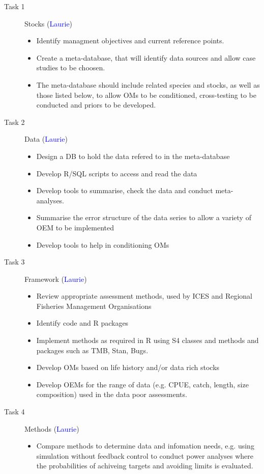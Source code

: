 \documentclass[a4paper, 10pt]{article}
\newcommand{\laurie}{\textcolor{blue}}
\begin{document}
\begin{description}
 \item[Task 1] Stocks (\laurie{Laurie})
 \begin{itemize}
  \item Identify managment objectives and current reference points.
  \item Create a meta-database, that will identify data sources and allow case studies to be choosen.
  \item The meta-database should include related species and stocks, as well as those listed below, to allow OMs to be conditioned, cross-testing to be conducted and priors to be developed.
 \end{itemize}
 \item[Task 2] Data (\laurie{Laurie})
  \begin{itemize}
  \item Design a DB to hold the data refered to in the meta-database
  \item Develop R/SQL scripts to access and read the data
  \item Develop tools to summarise, check the data and conduct meta-analyses. 
  \item Summarise the error structure of the data series to allow a variety of OEM to be implemented
  \item Develop tools to help in conditioning OMs
 \end{itemize}
 \item[Task 3] Framework (\laurie{Laurie})
  \begin{itemize}
  \item Review appropriate assessment methods, used by ICES and Regional Fisheries Management Organisations
  \item Identify code and R packages
  \item Implement methods as required in R using S4 classes and methods and packages such as TMB, Stan, Bugs.
  \item Develop OMs based on life history and/or data rich stocks
  \item Develop OEMs for the range of data (e.g. CPUE, catch, length, size composition) used in the data poor assessments.
 \end{itemize} 
 \item[Task 4] Methods (\laurie{Laurie})
  \begin{itemize}
  \item Compare methods to determine data and infomation needs, e.g. using simulation without feedback control to conduct power analyses where the probabilities of achiveing targets and avoiding limits is evaluated. 

\end{itemize}
\end{description}
\end{document}
